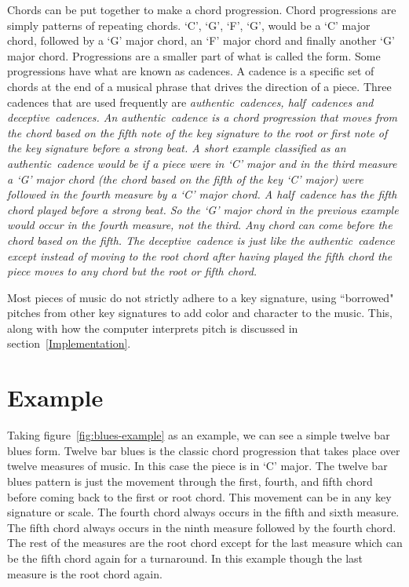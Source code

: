 \documentclass[12pt]{ucthesis}
\begin{document}
Chords can be put together to make a chord progression. Chord progressions are simply patterns of repeating chords. `C', `G', `F', `G', would be a `C' major chord, followed by a `G' major chord, an `F' major chord and finally another `G' major chord. Progressions are a smaller part of what is called the form. Some progressions have what are known as cadences. A cadence is a specific set of chords at the end of a musical phrase that drives the direction of a piece. Three cadences that are used frequently are \em{authentic}~\em cadences, \em{half}~\em cadences and \em{deceptive}~\em cadences. An \em{authentic}~\em cadence is a chord progression that moves from the chord based on the fifth note of the key signature to the root or first note of the key signature before a strong beat. A short example classified as an \em{authentic}~\em cadence would be if a piece were in `C' major and in the third measure a `G' major chord (the chord based on the fifth of the key `C' major) were followed in the fourth measure by a `C' major chord. A \em{half}~\em cadence has the fifth chord played before a strong beat. So the `G' major chord in the previous example would occur in the fourth measure, not the third. Any chord can come before the chord based on the fifth. The \em{deceptive}~\em cadence is just like the \em{authentic}~\em cadence except instead of moving to the root chord after having played the fifth chord the piece moves to any chord but the root or fifth chord. 

Most pieces of music do not strictly adhere to a key signature, using ``borrowed" pitches from other key signatures to add color and character to the music. This, along with how the computer interprets pitch is discussed in section~\ref{Implementation}.

\section{Example}

Taking figure~\ref{fig:blues-example} as an example, we can see a simple twelve bar blues form. Twelve bar blues is the classic chord progression that takes place over twelve measures of music. In this case the piece is in `C' major. The twelve bar blues pattern is just the movement through the first, fourth, and fifth chord before coming back to the first or root chord. This movement can be in any key signature or scale. The fourth chord always occurs in the fifth and sixth measure. The fifth chord always occurs in the ninth measure followed by the fourth chord. The rest of the measures are the root chord except for the last measure which can be the fifth chord again for a turnaround. In this example though the last measure is the root chord again.
\end{document}

